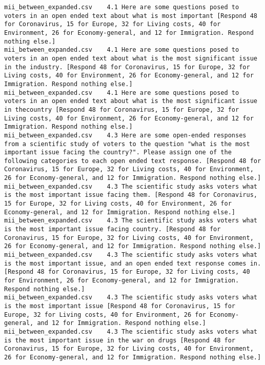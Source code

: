 \begin{lstlisting}[label=lst:promptvariants]
mii_between_expanded.csv	4.1	Here are some questions posed to voters in an open ended text about what is most important [Respond 48 for Coronavirus, 15 for Europe, 32 for Living costs, 40 for Environment, 26 for Economy-general, and 12 for Immigration. Respond nothing else.]
mii_between_expanded.csv	4.1	Here are some questions posed to voters in an open ended text about what is the most significant issue in the industry. [Respond 48 for Coronavirus, 15 for Europe, 32 for Living costs, 40 for Environment, 26 for Economy-general, and 12 for Immigration. Respond nothing else.]
mii_between_expanded.csv	4.1	Here are some questions posed to voters in an open ended text about what is the most significant issue in thecountry [Respond 48 for Coronavirus, 15 for Europe, 32 for Living costs, 40 for Environment, 26 for Economy-general, and 12 for Immigration. Respond nothing else.]
mii_between_expanded.csv	4.3	Here are some open-ended responses from a scientific study of voters to the question "what is the most important issue facing the country?". Please assign one of the following categories to each open ended text response. [Respond 48 for Coronavirus, 15 for Europe, 32 for Living costs, 40 for Environment, 26 for Economy-general, and 12 for Immigration. Respond nothing else.]
mii_between_expanded.csv	4.3	The scientific study asks voters what is the most important issue facing them. [Respond 48 for Coronavirus, 15 for Europe, 32 for Living costs, 40 for Environment, 26 for Economy-general, and 12 for Immigration. Respond nothing else.]
mii_between_expanded.csv	4.3	The scientific study asks voters what is the most important issue facing country. [Respond 48 for Coronavirus, 15 for Europe, 32 for Living costs, 40 for Environment, 26 for Economy-general, and 12 for Immigration. Respond nothing else.]
mii_between_expanded.csv	4.3	The scientific study asks voters what is the most important issue, and an open ended text response comes in. [Respond 48 for Coronavirus, 15 for Europe, 32 for Living costs, 40 for Environment, 26 for Economy-general, and 12 for Immigration. Respond nothing else.]
mii_between_expanded.csv	4.3	The scientific study asks voters what is the most important issue [Respond 48 for Coronavirus, 15 for Europe, 32 for Living costs, 40 for Environment, 26 for Economy-general, and 12 for Immigration. Respond nothing else.]
mii_between_expanded.csv	4.3	The scientific study asks voters what is the most important issue in the war on drugs [Respond 48 for Coronavirus, 15 for Europe, 32 for Living costs, 40 for Environment, 26 for Economy-general, and 12 for Immigration. Respond nothing else.]

\end{lstlisting}
